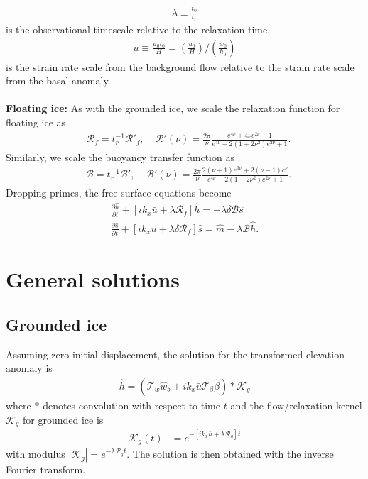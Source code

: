 \documentclass[paper=a4, fontsize=11pt]{article}
\begin{document}
\begin{align}
  \lambda \equiv  \frac{t_0}{t_r}
\end{align}
is the observational timescale relative to the relaxation time,
\begin{align}
\bar{u} \equiv \frac{u_0 t_0}{H} = \left(\frac{u_0}{H}\right) / \left(\frac{w_0}{h_0}\right)
\end{align}
is the strain rate scale from the background flow relative to the strain rate
scale from the basal anomaly.
\\ \\
\textbf{Floating ice:}
As with the grounded ice, we scale the relaxation function for floating ice as
\begin{align}
   &\mathcal{R}_f = t_r^{-1} \mathcal{R}'_f, \;\;\;\;
 \mathcal{R}'(\nu) =  \frac{2\pi}{\nu}\frac{e^{4\nu} +4\nu e^{2\nu} -1 }{e^{4\nu} -2(1+2\nu^2)e^{2\nu} +1}.
\end{align}
Similarly, we scale the buoyancy transfer function as
\begin{align}
   &\mathcal{B} =  t_r^{-1} \mathcal{B}', \;\;\;\;
 \mathcal{B}'(\nu) =   \frac{2\pi}{\nu}\frac{ 2(\nu+1)e^{3\nu}+2(\nu-1)e^{\nu} }{e^{4\nu} -2(1+2\nu^2)e^{2\nu} +1}.
\end{align}
Dropping primes, the free surface equations become
\begin{align}
\frac{\partial \hat{h}}{\partial t}+ \left[ik_x \bar{u}  + \lambda \mathcal{R}_f\right]\hat{h} = -\lambda \delta\mathcal{B}\hat{s}\\
\frac{\partial \hat{s}}{\partial t}+ [ik_x\bar{u}  + \lambda\delta \mathcal{R}_f]\hat{s} = \hat{m} - \lambda \mathcal{B} \hat{h}.
\end{align}

\section*{General solutions}
\subsection*{Grounded ice}
Assuming zero initial displacement, the solution for the transformed elevation anomaly is
\begin{align}
\hat{h} = (\mathcal{T}_w\hat{w}_b + ik_x\bar{u}\mathcal{T}_{\beta}\hat{\beta}  )* \mathcal{K}_g \label{hath0}
\end{align}
where $*$ denotes convolution with respect to time $t$ and
the flow/relaxation kernel $\mathcal{K}_g$ for grounded ice is
\begin{align}
\mathcal{K}_g(t) &= e^{-[ik_x\bar{u}+\lambda \mathcal{R}_g]t}
\end{align}
with modulus $|\mathcal{K}_g| = e^{-\lambda\mathcal{R}_gt}$.
The solution is then obtained with the inverse Fourier transform.
\end{document}
